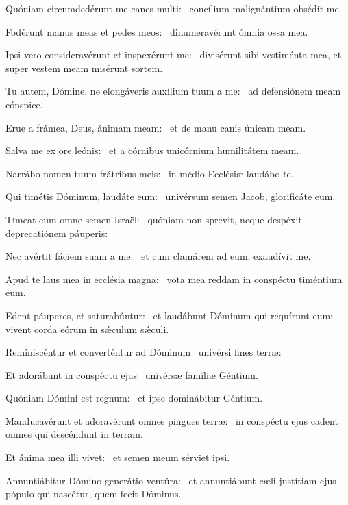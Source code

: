 \item Quóniam circumdedérunt me canes multi:~\psstar{} concílium malignántium obsédit me.

\item Fodérunt manus meas et pedes meos:~\psstar{} dinumeravérunt ómnia ossa mea.

\item Ipsi vero consideravérunt et inspexérunt me:~\psstar{} divisérunt sibi vestiménta mea, et super vestem meam misérunt sortem.

\item Tu autem, Dómine, ne elongáveris auxílium tuum a me:~\psstar{} ad defensiónem meam cónspice.

\item Erue a frámea, Deus, ánimam meam:~\psstar{} et de manu canis únicam meam.

\item Salva me ex ore leónis:~\psstar{} et a córnibus unicórnium humilitátem meam.

\item Narrábo nomen tuum frátribus meis:~\psstar{} in médio Ecclésiæ laudábo te.

\item Qui timétis Dóminum, laudáte eum:~\psstar{} univérsum semen Jacob, glorificáte eum.

\item Tímeat eum omne semen Israël:~\psstar{} quóniam non sprevit, neque despéxit deprecatiónem páuperis:

\item Nec avértit fáciem suam a me:~\psstar{} et cum clamárem ad eum, exaudívit me.

\item Apud te laus mea in ecclésia magna:~\psstar{} vota mea reddam in conspéctu timéntium eum.

\item Edent páuperes, et saturabúntur:~\pscross{} et laudábunt Dóminum qui requírunt eum:~\psstar{} vivent corda eórum in sǽculum sǽculi.

\item Reminiscéntur et converténtur ad Dóminum~\psstar{} univérsi fines terræ:

\item Et adorábunt in conspéctu ejus~\psstar{} univérsæ famíliæ Géntium.

\item Quóniam Dómini est regnum:~\psstar{} et ipse dominábitur Géntium.

\item Manducavérunt et adoravérunt omnes pingues terræ:~\psstar{} in conspéctu ejus cadent omnes qui descéndunt in terram.

\item Et ánima mea illi vivet:~\psstar{} et semen meum sérviet ipsi.

\item Annuntiábitur Dómino generátio ventúra:~\psstar{} et annuntiábunt cæli justítiam ejus pópulo qui nascétur, quem fecit Dóminus.

